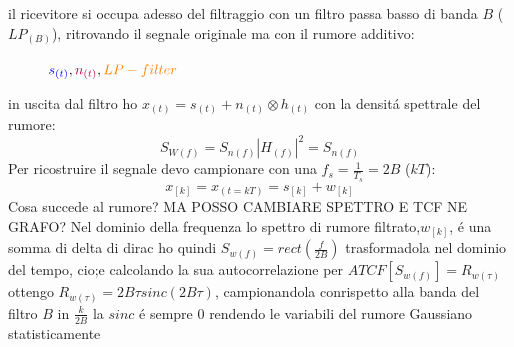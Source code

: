             il ricevitore si occupa adesso del filtraggio con un filtro passa basso di banda $B$ ($LP_{(B)}$), ritrovando il 
            segnale originale ma con il rumore additivo:
            \begin{figure}[H]
                \centering
                \caption{${\color{blue}s_{(t)}},{\color{purple}n_{(t)}},{\color{orange}LP-filter}$}
            \end{figure}
            in uscita dal filtro ho $x_{(t)} = s_{(t)} + n_{(t)} \otimes h_{(t)}$ con la densitá spettrale del rumore:
            \[
                S_{W(f)} = S_{n(f)} |H_{(f)}|^2 = S_{n(f)} 
            \]
            Per ricostruire il segnale devo campionare con una $f_s = \frac{1}{T_s} = 2B$ ($kT$):
            \[
                x_{[k]} = x_{(t=kT)} = s_{[k]}+w_{[k]}    
            \]
            Cosa succede al rumore? MA POSSO CAMBIARE SPETTRO E TCF NE GRAFO?
            Nel dominio della frequenza lo spettro di rumore filtrato,$w_{[k]}$, é  una somma di delta di dirac ho quindi $S_{w(f)} = rect\left(\frac{f}{2B}\right)$
            trasformadola nel dominio del tempo, cio;e calcolando la sua autocorrelazione per $ATCF[S_{w(f)}] = R_{w(\tau)}$ ottengo $R_{w(\tau)} = 2B\tau sinc(2B\tau)$,
            campionandola conrispetto alla banda del filtro $B$ in $\frac{k}{2B}$ la $sinc$ é sempre $0$ rendendo le variabili del rumore Gaussiano statisticamente 

